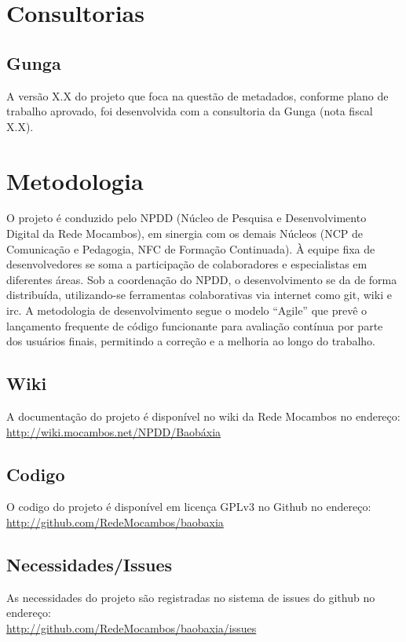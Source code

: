 \section{Consultorias}
\subsection{Gunga}
A versão X.X do projeto que foca na questão de metadados, conforme
plano de trabalho aprovado, foi desenvolvida com a consultoria da
Gunga (nota fiscal X.X).


\section{Metodologia}
O projeto é conduzido pelo NPDD (Núcleo de Pesquisa e Desenvolvimento
Digital da Rede Mocambos), em sinergia com os demais Núcleos (NCP de
Comunicação e Pedagogia, NFC de Formação Continuada). À equipe fixa de
desenvolvedores se soma a participação de colaboradores e
especialistas em diferentes áreas. Sob a coordenação do NPDD, o
desenvolvimento se da de forma distribuída, utilizando-se ferramentas
colaborativas via internet como git, wiki e irc. A metodologia de
desenvolvimento segue o modelo ``Agile'' que prevê o lançamento
frequente de código funcionante para avaliação contínua por parte dos
usuários finais, permitindo a correção e a melhoria ao longo do
trabalho.

\subsection{Wiki}
A documentação do projeto é disponível no wiki da Rede Mocambos no
endereço: \\ \url{http://wiki.mocambos.net/NPDD/Baobáxia}

\subsection{Codigo}
O codigo do projeto é disponível em licença GPLv3 no Github no
endereço: \\ \url{http://github.com/RedeMocambos/baobaxia}

\subsection{Necessidades/Issues}
As necessidades do projeto são registradas no sistema de issues do
github no endereço:
\\ \url{http://github.com/RedeMocambos/baobaxia/issues}

